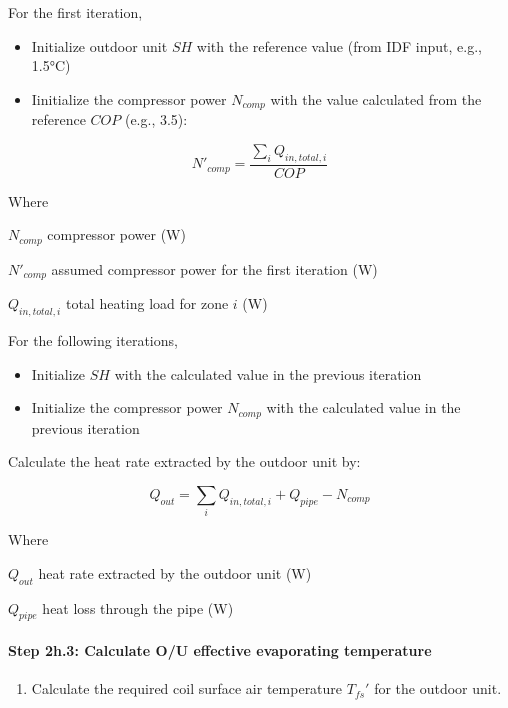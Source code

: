 For the first iteration,

\begin{itemize}
\item
  Initialize outdoor unit \(SH\) with the reference value (from IDF input, e.g., 1.5°C)
\item
  Iinitialize the compressor power \(N_{comp}\) with the value calculated from the reference \(COP\) (e.g., 3.5):
\end{itemize}

\begin{equation}
N'_{comp} = \frac{\sum_iQ_{in,total,i}}{COP}
\end{equation}

Where

\(N_{comp}\) compressor power (W)

\(N'_{comp}\) assumed compressor power for the first iteration (W)

\(Q_{in,total,i}\) total heating load for zone \(i\) (W)

For the following iterations,

\begin{itemize}
\item
  Initialize \(SH\) with the calculated value in the previous iteration
\item
  Initialize the compressor power \(N_{comp}\) with the calculated value in the previous iteration
\end{itemize}

Calculate the heat rate extracted by the outdoor unit by:

\begin{equation}
Q_{out} = \sum_iQ_{in,total,i}+Q_{pipe}-N_{comp}
\end{equation}

Where

\(Q_{out}\) heat rate extracted by the outdoor unit (W)

\(Q_{pipe}\) heat loss through the pipe (W)

\paragraph{Step 2h.3: Calculate O/U effective evaporating temperature}\label{step-2h.3-calculate-ou-effective-evaporating-temperature}

\begin{enumerate}
\def\labelenumi{(\arabic{enumi})}
\tightlist
\item
  Calculate the required coil surface air temperature \({T_{fs}}'\) for the outdoor unit.
\end{enumerate}

